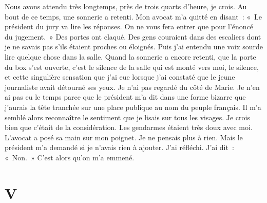 \documentclass[french,twoside]{book} %
\newcommand\chapteropen{} %
\newcommand\chapterclose{} %
\begin{document}
Nous avons attendu très longtemps, près de trois quarts d’heure, je crois. Au bout de ce temps, une sonnerie a retenti. Mon avocat m’a quitté en disant : « Le président du jury va lire les réponses. On ne vous fera entrer que pour l’énoncé du jugement. » Des portes ont claqué. Des gens couraient dans des escaliers dont je ne savais pas s’ils étaient proches ou éloignés. Puis j’ai entendu une voix sourde lire quelque chose dans la salle. Quand la sonnerie a encore retenti, que la porte du box s’est ouverte, c’est le silence de la salle qui est monté vers moi, le silence, et cette singulière sensation que j’ai eue lorsque j’ai constaté que le jeune journaliste avait détourné ses yeux. Je n’ai pas regardé du côté de Marie. Je n’en ai pas eu le temps parce que le président m’a dit dans une forme bizarre que j’aurais la tête tranchée sur une place publique au nom du peuple français. Il m’a semblé alors reconnaître le sentiment que je lisais sur tous les visages. Je crois bien que c’était de la considération. Les gendarmes étaient très doux avec moi. L'avocat a posé sa main sur mon poignet. Je ne pensais plus à rien. Mais le président m’a demandé si je n’avais rien à ajouter. J'ai réfléchi. J'ai dit : « Non. » C'est alors qu’on m’a emmené.
\chapterclose


\chapteropen
\chapter[{V}]{V}
\label{II5}
\end{document}
